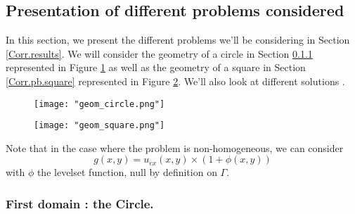 
\subsection{Presentation of different problems considered} \label{Corr.problems}


In this section, we present the different problems we'll be considering in Section \ref{Corr.results}. We will consider the geometry of a circle in Section \ref{Corr.pb.circle} represented in Figure \ref{geom_circle} as well as the geometry of a square in Section \ref{Corr.pb.square} represented in Figure \ref{geom_square}. We'll also look at different solutions .

\begin{minipage}{0.48\linewidth}
	\begin{figure}[H]
		\centering
		\texttt{[image: "geom\_circle.png"]}
		\label{geom_circle}
	\end{figure} 
\end{minipage}
\begin{minipage}{0.48\linewidth}
	\begin{figure}[H]
		\centering
		\texttt{[image: "geom\_square.png"]}
		\label{geom_square}
	\end{figure} 
\end{minipage}

\begin{Rem}
	Note that in the case where the problem is non-homogeneous, we can consider
	\begin{equation*}
	g(x,y)=u_{ex}(x,y)\times(1+\phi(x,y))
	\end{equation*}
	with $\phi$ the levelset function, null by definition on $\Gamma$.
\end{Rem}

\subsubsection{First domain : the Circle.} \label{Corr.pb.circle}

